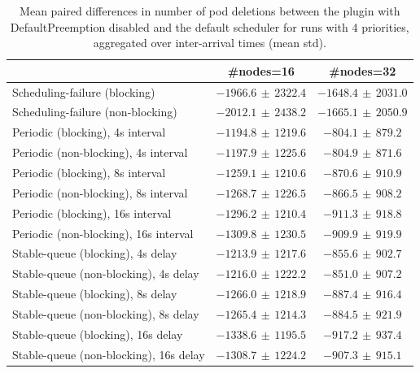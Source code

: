 \begin{table}[t]
\tiny
\setlength{\tabcolsep}{1.2pt}
\renewcommand{\arraystretch}{1.12}
\centering
\caption{Mean paired differences in number of pod deletions between the plugin with DefaultPreemption disabled and the default scheduler for runs with 4 priorities, aggregated over inter-arrival times (mean \pm std).}
\label{tab:deletions-defpreempt0-prio4-std1-agg-arrival}
\begin{tabular}{l c c}
\toprule
 & \#nodes=16 & \#nodes=32 \\
\midrule
Scheduling-failure (blocking) & $-1966.6\,\pm\,2322.4$ & $-1648.4\,\pm\,2031.0$ \\
Scheduling-failure (non-blocking) & $-2012.1\,\pm\,2438.2$ & $-1665.1\,\pm\,2050.9$ \\
Periodic (blocking), 4s interval & $-1194.8\,\pm\,1219.6$ & $-804.1\,\pm\,879.2$ \\
Periodic (non-blocking), 4s interval & $-1197.9\,\pm\,1225.6$ & $-804.9\,\pm\,871.6$ \\
Periodic (blocking), 8s interval & $-1259.1\,\pm\,1210.6$ & $-870.6\,\pm\,910.9$ \\
Periodic (non-blocking), 8s interval & $-1268.7\,\pm\,1226.5$ & $-866.5\,\pm\,908.2$ \\
Periodic (blocking), 16s interval & $-1296.2\,\pm\,1210.4$ & $-911.3\,\pm\,918.8$ \\
Periodic (non-blocking), 16s interval & $-1309.8\,\pm\,1230.5$ & $-909.9\,\pm\,919.9$ \\
Stable-queue (blocking), 4s delay & $-1213.9\,\pm\,1217.6$ & $-855.6\,\pm\,902.7$ \\
Stable-queue (non-blocking), 4s delay & $-1216.0\,\pm\,1222.2$ & $-851.0\,\pm\,907.2$ \\
Stable-queue (blocking), 8s delay & $-1266.0\,\pm\,1218.9$ & $-887.4\,\pm\,916.4$ \\
Stable-queue (non-blocking), 8s delay & $-1265.4\,\pm\,1214.3$ & $-884.5\,\pm\,921.9$ \\
Stable-queue (blocking), 16s delay & $-1338.6\,\pm\,1195.5$ & $-917.2\,\pm\,937.4$ \\
Stable-queue (non-blocking), 16s delay & $-1308.7\,\pm\,1224.2$ & $-907.3\,\pm\,915.1$ \\
\bottomrule
\end{tabular}
\end{table}
